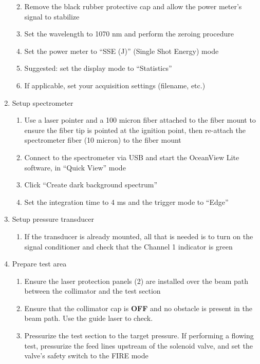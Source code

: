 \begin{enumerate}
\begin{enumerate}
  \item
    Remove the black rubber protective cap and allow the power meter's
    signal to stabilize
  \item
    Set the wavelength to 1070 nm and perform the zeroing procedure
  \item
    Set the power meter to ``SSE (J)'' (Single Shot Energy) mode
  \item
    Suggested: set the display mode to ``Statistics''
  \item
    If applicable, set your acquisition settings (filename, etc.)
  \end{enumerate}
\item
  Setup spectrometer

  \begin{enumerate}
  \def\labelenumii{\arabic{enumii}.}
  
  \item
    Use a laser pointer and a 100 micron fiber attached to the fiber
    mount to ensure the fiber tip is pointed at the ignition point, then
    re-attach the spectrometer fiber (10 micron) to the fiber mount
  \item
    Connect to the spectrometer via USB and start the OceanView Lite
    software, in ``Quick View'' mode
  \item
    Click ``Create dark background spectrum''
  \item
    Set the integration time to 4 ms and the trigger mode to ``Edge''
  \end{enumerate}
\item
  Setup pressure transducer

  \begin{enumerate}
  \def\labelenumii{\arabic{enumii}.}
  
  \item
    If the transducer is already mounted, all that is needed is to turn
    on the signal conditioner and check that the Channel 1 indicator is
    green
  \end{enumerate}
\item
  Prepare test area

  \begin{enumerate}
  \def\labelenumii{\arabic{enumii}.}
  \item
    Ensure the laser protection panels (2) are installed over the beam
    path between the collimator and the test section
  \item
    Ensure that the collimator cap is \textbf{OFF}
    and no obstacle is present in the beam path. Use the guide laser to
    check.
  \item
    Pressurize the test section to the target pressure. If performing a
    flowing test, pressurize the feed lines upstream of the solenoid
    valve, and set the valve's safety switch to the FIRE mode


\end{enumerate}
\end{enumerate}
